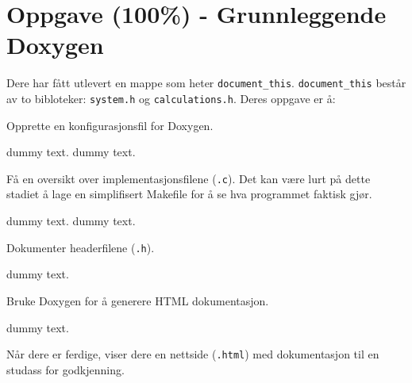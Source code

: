 \section{Oppgave (100\%) - Grunnleggende Doxygen}\label{sec:3-oppgave}

Dere har fått utlevert en mappe som heter \verb|document_this|. \verb|document_this| består av to bibloteker: \verb|system.h| og \verb|calculations.h|. Deres oppgave er å:

\begin{subprob}
    Opprette en konfigurasjonsfil for Doxygen.
	\begin{solution}
	    dummy text. dummy text. 
	\end{solution}
\end{subprob}

\begin{subprob}
    Få en oversikt over implementasjonsfilene (\verb|.c|). Det kan være lurt på dette stadiet å lage en simplifisert Makefile for å se hva programmet faktisk gjør.	\begin{solution}
        dummy text. dummy text. 
	\end{solution}
\end{subprob}

\begin{subprob}
    Dokumenter headerfilene (\verb|.h|).
	\begin{solution}
	    dummy text. 
	\end{solution}
\end{subprob}

\begin{subprob}
    Bruke Doxygen for å generere HTML dokumentasjon.
	\begin{solution}
	    dummy text. 
	\end{solution}
\end{subprob}




Når dere er ferdige, viser dere en nettside (\verb|.html|) med dokumentasjon til en studass
for godkjenning.
